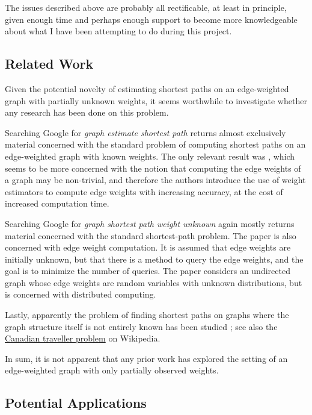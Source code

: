 The issues described above are probably all rectificable, at least in principle, given enough time and perhaps enough support to become more knowledgeable about what I have been attempting to do during this project.

\subsection{Related Work}

Given the potential novelty of estimating shortest paths on an edge-weighted graph with partially unknown weights, it seems worthwhile to investigate whether any research has been done on this problem.

Searching Google for \textit{graph estimate shortest path} returns almost exclusively material concerned with the standard problem of computing shortest paths on an edge-weighted graph with known weights. The only relevant result was \cite{weiss2022generalization}, which seems to be more concerned with the notion that computing the edge weights of a graph may be non-trivial, and therefore the authors introduce the use of weight estimators to compute edge weights with increasing accuracy, at the cost of increased computation time.

Searching Google for \textit{graph shortest path weight unknown} again mostly returns material concerned with the standard shortest-path problem. The paper \cite{szepesvari2004shortest} is also concerned with edge weight computation. It is assumed that edge weights are initially unknown, but that there is a method to query the edge weights, and the goal is to minimize the number of queries. The paper \cite{tehrani2013distributed} considers an undirected graph whose edge weights are random variables with unknown distributions, but is concerned with distributed computing.

Lastly, apparently the problem of finding shortest paths on graphs where the graph structure itself is not entirely known has been studied \cite{papadimitriou1991shortest}; see also the \href{https://en.wikipedia.org/wiki/Canadian_traveller_problem#:~:text=In%20computer%20science%20and%20graph,a%20certain%20%22realization%20restriction.%22}{Canadian traveller problem} on Wikipedia.

In sum, it is not apparent that any prior work has explored the setting of an edge-weighted graph with only partially observed weights.

\subsection{Potential Applications}\label{sec:pot_app}

